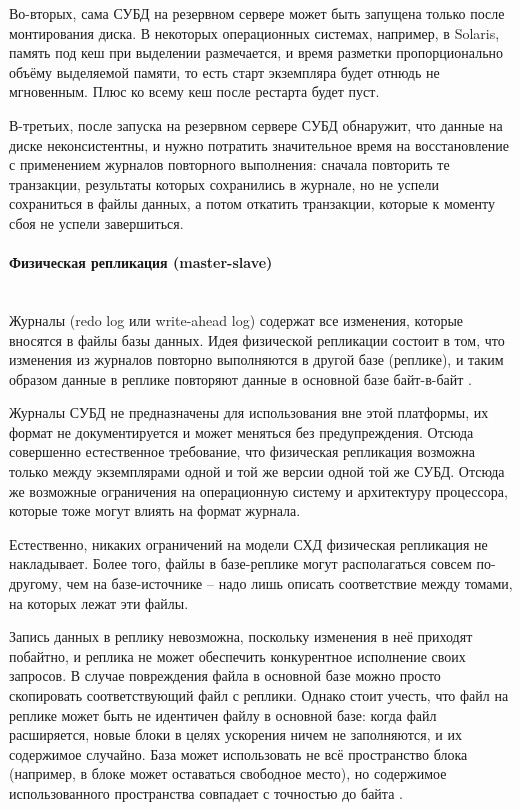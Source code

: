 Во-вторых, сама СУБД на резервном сервере может быть запущена только после монтирования диска. В некоторых операционных
системах, например, в Solaris, память под кеш при выделении размечается, и время разметки пропорционально объёму
выделяемой памяти, то есть старт экземпляра будет отнюдь не мгновенным. Плюс ко всему кеш после рестарта будет пуст.

В-третьих, после запуска на резервном сервере СУБД обнаружит, что данные на диске неконсистентны, и нужно потратить
значительное время на восстановление с применением журналов повторного выполнения: сначала повторить те транзакции,
результаты которых сохранились в журнале, но не успели сохраниться в файлы данных, а потом откатить транзакции, которые
к моменту сбоя не успели завершиться. \autocite{Replication}

\paragraph{Физическая репликация (master-slave)} ~\\
Журналы (redo log или write-ahead log) содержат все изменения, которые вносятся в файлы базы данных. Идея физической
репликации состоит в том, что изменения из журналов повторно выполняются в другой базе (реплике), и таким образом данные
в реплике повторяют данные в основной базе байт-в-байт \autocite{PhysLogPeplic}.

Журналы СУБД не предназначены для использования вне этой платформы, их формат не документируется и может меняться без
предупреждения. Отсюда совершенно естественное требование, что физическая репликация возможна только между экземплярами
одной и той же версии одной той же СУБД. Отсюда же возможные ограничения на операционную систему и архитектуру
процессора, которые тоже могут влиять на формат журнала.

Естественно, никаких ограничений на модели СХД физическая репликация не накладывает. Более того, файлы в базе-реплике
могут располагаться совсем по-другому, чем на базе-источнике – надо лишь описать соответствие между томами, на которых
лежат эти файлы.

Запись данных в реплику невозможна, поскольку изменения в неё приходят побайтно, и реплика не может обеспечить
конкурентное исполнение своих запросов. В случае повреждения файла в основной базе можно просто скопировать
соответствующий файл с реплики. Однако стоит учесть, что файл на реплике может быть не идентичен файлу в основной базе:
когда файл расширяется, новые блоки в целях ускорения ничем не заполняются, и их содержимое случайно. База может
использовать не всё пространство блока (например, в блоке может оставаться свободное место), но содержимое
использованного пространства совпадает с точностью до байта \autocite{PhysLogPeplic}.

